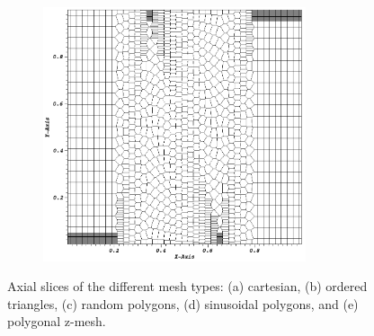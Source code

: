 \begin{figure}
\begin{subfigure}[b]{0.45\textwidth}
		\includegraphics[width=0.85\textwidth]{figures/sec_DSA/SIP_z_poly_mesh.png}
		\caption{}
	\end{subfigure}
\caption{Axial slices of the different mesh types: (a) cartesian, (b) ordered triangles, (c) random polygons, (d) sinusoidal polygons, and (e) polygonal z-mesh.}
\label{fig::SIP_mesh_slices}
\end{figure}

